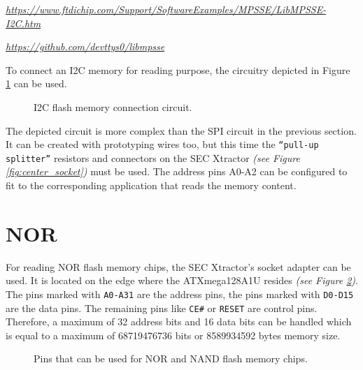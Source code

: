 \documentclass[a4paper]{report}
\begin{document}
\textit{\url{https://www.ftdichip.com/Support/SoftwareExamples/MPSSE/LibMPSSE-I2C.htm}}

\textit{\url{https://github.com/devttys0/libmpsse}}

To connect an I2C memory for reading purpose, the circuitry depicted in Figure \ref{fig:i2c_circuit} can be used.
\begin{figure}[ht] 
  \centering
  {
   \setlength{\fboxsep}{0pt}
   \setlength{\fboxrule}{0.5pt}
  }
  \caption{I2C flash memory connection circuit.}
  \label{fig:i2c_circuit}
\end{figure}
The depicted circuit is more complex than the SPI circuit in the previous section.
It can be created with prototyping wires too, but this time the \texttt{``pull-up splitter''} resistors and connectors on the SEC Xtractor \textit{(see Figure \ref{fig:center_socket})} must be used.
The address pins A0-A2 can be configured to fit to the corresponding application that reads the memory content.
\section{NOR}
For reading NOR flash memory chips, the SEC Xtractor's socket adapter can be used. 
It is located on the edge where the ATXmega128A1U resides \textit{(see Figure \ref{fig:nor_nand_socket})}.
The pins marked with \texttt{A0-A31} are the address pins, the pins marked with \texttt{D0-D15} are the data pins.
The remaining pins like \texttt{CE\#} or \texttt{RESET} are control pins.
Therefore, a maximum of 32 address bits and 16 data bits can be handled which is equal to a maximum of 68719476736 bits or 8589934592 bytes memory size.
\begin{figure}[ht] 
  \centering
  {
   \setlength{\fboxsep}{0pt}
   \setlength{\fboxrule}{0.5pt}
  }
  \caption{Pins that can be used for NOR and NAND flash memory chips.}
  \label{fig:nor_nand_socket}
\end{figure}
\end{document}
